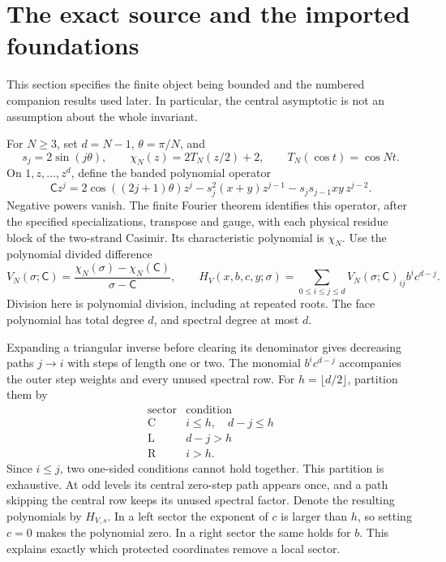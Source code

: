 \documentclass[11pt]{article}
\numberwithin{equation}{section}
\theoremstyle{definition}\newtheorem{definition}[theorem]{Definition}
\theoremstyle{remark}\newtheorem{remark}[theorem]{Remark}
\newcommand{\C}{\mathrm C}
\newcommand{\Lft}{\mathrm L}
\newcommand{\Rgt}{\mathrm R}
\begin{document}
\section{The exact source and the imported foundations}\label{pc:finite}

This section specifies the finite object being bounded and the
numbered companion results used later. In particular, the central
asymptotic is not an assumption about the whole invariant.

For \(N\ge3\), set \(d=N-1\), \(\theta=\pi/N\), and
\[
 s_j=2\sin(j\theta),\qquad
 \chi_N(z)=2T_N(z/2)+2,\qquad T_N(\cos t)=\cos Nt.
\]
On \(1,z,\ldots,z^d\), define the banded polynomial operator
\[
 \mathsf C z^j=2\cos((2j+1)\theta)z^j
       -s_j^2(x+y)z^{j-1}-s_js_{j-1}xy\,z^{j-2}.
\]
Negative powers vanish. The finite Fourier theorem
\cite[Proposition 4.1]{Finite} identifies this operator, after the
specified specializations, transpose and gauge, with each physical
residue block of the two-strand Casimir. Its characteristic polynomial
is \(\chi_N\). Use the polynomial divided difference
\[
 V_N(\sigma;\mathsf C)=
       \frac{\chi_N(\sigma)-\chi_N(\mathsf C)}{\sigma-\mathsf C},
 \qquad
 H_V(x,b,c,y;\sigma)=
       \sum_{0\le i\le j\le d}V_N(\sigma;\mathsf C)_{ij}b^ic^{d-j}.
\]
Division here is polynomial division, including at repeated roots.
The face polynomial has total degree \(d\), and spectral degree at
most \(d\).

Expanding a triangular inverse before clearing its denominator gives
decreasing paths \(j\to i\) with steps of length one or two. The
monomial \(b^ic^{d-j}\) accompanies the outer step weights and every
unused spectral row. For \(h=\lfloor d/2\rfloor\), partition them by
\begin{equation}\label{pc:partition}
\begin{array}{c|c}
 \text{sector}&\text{condition}\\ \hline
 \C&i\le h,\quad d-j\le h\\
 \Lft&d-j>h\\
 \Rgt&i>h .
\end{array}
\end{equation}
Since \(i\le j\), two one-sided conditions cannot hold together.
This partition is exhaustive. At odd levels its central zero-step
path appears once, and a path skipping the central row keeps its
unused spectral factor. Denote the resulting polynomials by
\(H_{V,s}\). In a left sector the exponent of $c$ is larger than $h$, so setting
$c=0$ makes the polynomial zero. In a right sector the same holds
for $b$. This explains exactly which protected coordinates remove
a local sector.
\end{document}
